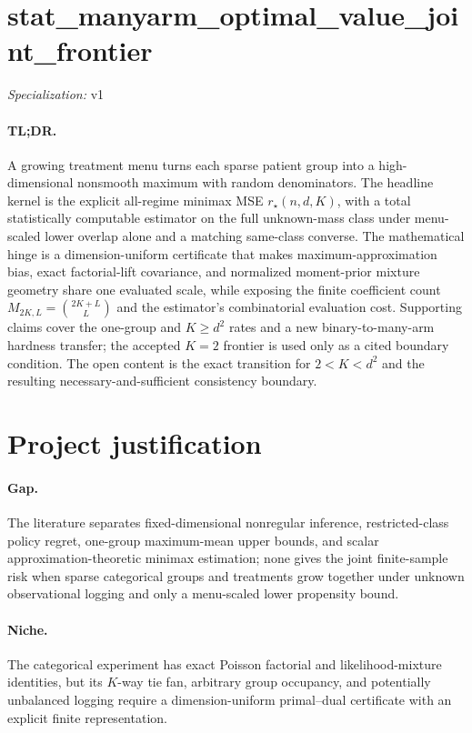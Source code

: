 \documentclass{article}
\begin{document}
\sloppy

\section*{stat\_\allowbreak{}manyarm\_\allowbreak{}optimal\_\allowbreak{}value\_\allowbreak{}joint\_\allowbreak{}frontier}

\noindent\textit{Specialization:} v1\par

\paragraph{TL;DR.} A growing treatment menu turns each sparse patient group into a high-dimensional nonsmooth maximum with random denominators. The headline kernel is the explicit all-regime minimax MSE \(r_\star(n,d,K)\), with a total statistically computable estimator on the full unknown-mass class under menu-scaled lower overlap alone and a matching same-class converse. The mathematical hinge is a dimension-uniform certificate that makes maximum-approximation bias, exact factorial-lift covariance, and normalized moment-prior mixture geometry share one evaluated scale, while exposing the finite coefficient count \(M_{2K,L}=\binom{2K+L}{L}\) and the estimator's combinatorial evaluation cost. Supporting claims cover the one-group and \(K\ge d^2\) rates and a new binary-to-many-arm hardness transfer; the accepted \(K=2\) frontier is used only as a cited boundary condition. The open content is the exact transition for \(2<K<d^2\) and the resulting necessary-and-sufficient consistency boundary.

\section{Project justification}

\paragraph{Gap.} The literature separates fixed-dimensional nonregular inference, restricted-class policy regret, one-group maximum-mean upper bounds, and scalar approximation-theoretic minimax estimation; none gives the joint finite-sample risk when sparse categorical groups and treatments grow together under unknown observational logging and only a menu-scaled lower propensity bound.

\paragraph{Niche.} The categorical experiment has exact Poisson factorial and likelihood-mixture identities, but its \(K\)-way tie fan, arbitrary group occupancy, and potentially unbalanced logging require a dimension-uniform primal--dual certificate with an explicit finite representation.
\end{document}
